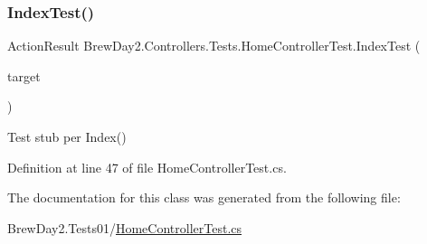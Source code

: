 \subsubsection{\texorpdfstring{Index\+Test()}{IndexTest()}}
{\footnotesize\ttfamily Action\+Result Brew\+Day2.\+Controllers.\+Tests.\+Home\+Controller\+Test.\+Index\+Test (\begin{DoxyParamCaption}\item[{\mbox{[}\+Pex\+Assume\+Under\+Test\mbox{]} \mbox{\hyperlink{class_brew_day2_1_1_controllers_1_1_home_controller}{Home\+Controller}}}]{target }\end{DoxyParamCaption})}



Test stub per Index()



Definition at line 47 of file Home\+Controller\+Test.\+cs.



The documentation for this class was generated from the following file\+:\begin{DoxyCompactItemize}
\item 
Brew\+Day2.\+Tests01/\mbox{\hyperlink{1_2_home_controller_test_8cs}{Home\+Controller\+Test.\+cs}}\end{DoxyCompactItemize}
